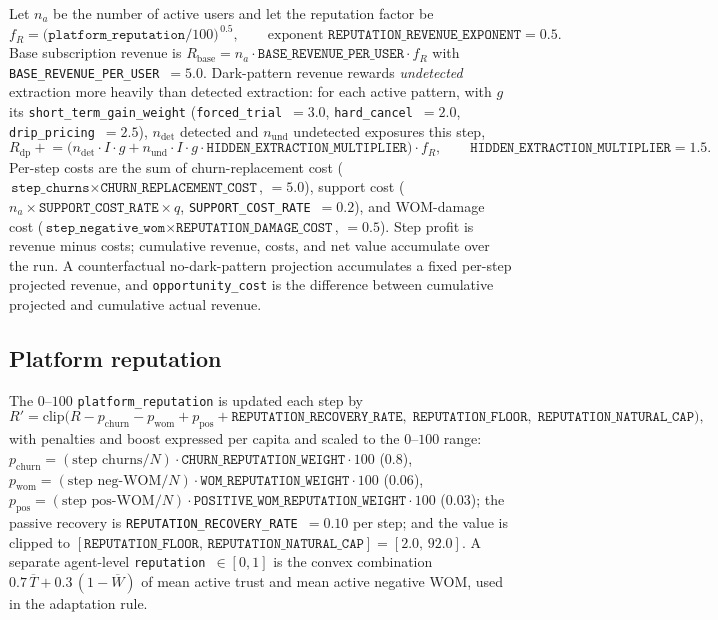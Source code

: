 \documentclass[11pt]{article}
\newcommand{\code}[1]{\texttt{#1}}
\begin{document}
Let $n_a$ be the number of active users and let the reputation factor be
\[
f_R = \big(\code{platform\_reputation}/100\big)^{\,0.5},
\qquad \text{exponent } \code{REPUTATION\_REVENUE\_EXPONENT} = 0.5 .
\]
Base subscription revenue is
$R_{\text{base}} = n_a \cdot \code{BASE\_REVENUE\_PER\_USER}\cdot f_R$ with
\code{BASE\_REVENUE\_PER\_USER}~$=5.0$. Dark-pattern revenue rewards
\emph{undetected} extraction more heavily than detected extraction: for each
active pattern, with $g$ its \code{short\_term\_gain\_weight}
(\code{forced\_trial}~$=3.0$, \code{hard\_cancel}~$=2.0$,
\code{drip\_pricing}~$=2.5$), $n_{\text{det}}$ detected and $n_{\text{und}}$
undetected exposures this step,
\[
R_{\text{dp}} \mathrel{+}= \Big(n_{\text{det}}\cdot I \cdot g
+ n_{\text{und}}\cdot I \cdot g \cdot \code{HIDDEN\_EXTRACTION\_MULTIPLIER}\Big)\cdot f_R,
\qquad \code{HIDDEN\_EXTRACTION\_MULTIPLIER}=1.5 .
\]
Per-step costs are the sum of churn-replacement cost
($\code{step\_churns}\times\code{CHURN\_REPLACEMENT\_COST}$, $=5.0$), support cost
($n_a\times\code{SUPPORT\_COST\_RATE}\times q$, \code{SUPPORT\_COST\_RATE}~$=0.2$),
and WOM-damage cost
($\code{step\_negative\_wom}\times\code{REPUTATION\_DAMAGE\_COST}$, $=0.5$).
Step profit is revenue minus costs; cumulative revenue, costs, and net value
accumulate over the run. A counterfactual no-dark-pattern projection accumulates a
fixed per-step projected revenue, and \code{opportunity\_cost} is the difference
between cumulative projected and cumulative actual revenue.

\subsection{Platform reputation}
\label{sub:reputation}

The $0$--$100$ \code{platform\_reputation} is updated each step by
\[
R' = \mathrm{clip}\Big(R - p_{\text{churn}} - p_{\text{wom}} + p_{\text{pos}}
+ \code{REPUTATION\_RECOVERY\_RATE},\;
\code{REPUTATION\_FLOOR},\; \code{REPUTATION\_NATURAL\_CAP}\Big),
\]
with penalties and boost expressed per capita and scaled to the $0$--$100$ range:
$p_{\text{churn}} = (\text{step churns}/N)\cdot\code{CHURN\_REPUTATION\_WEIGHT}\cdot100$
($0.8$), $p_{\text{wom}} = (\text{step neg-WOM}/N)\cdot\code{WOM\_REPUTATION\_WEIGHT}\cdot100$
($0.06$), $p_{\text{pos}} = (\text{step pos-WOM}/N)\cdot\code{POSITIVE\_WOM\_REPUTATION\_WEIGHT}\cdot100$
($0.03$); the passive recovery is \code{REPUTATION\_RECOVERY\_RATE}~$=0.10$ per
step; and the value is clipped to $[\code{REPUTATION\_FLOOR},\,
\code{REPUTATION\_NATURAL\_CAP}] = [2.0,\,92.0]$. A separate agent-level
\code{reputation}~$\in[0,1]$ is the convex combination
$0.7\,\overline{T} + 0.3\,(1 - \overline{W})$ of mean active trust and mean active
negative WOM, used in the adaptation rule.
\end{document}
